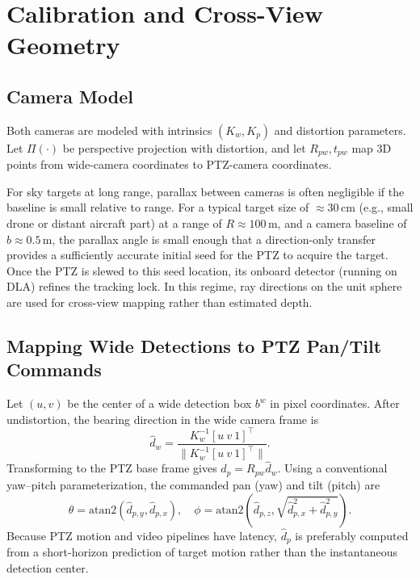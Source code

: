 \documentclass[conf]{new-aiaa}
\begin{document}
{\color{red}
\section{Calibration and Cross-View Geometry}
\subsection{Camera Model}
Both cameras are modeled with intrinsics $(K_w, K_p)$ and distortion parameters. Let $\Pi(\cdot)$ be perspective projection with distortion, and let $R_{pw}, t_{pw}$ map 3D points from wide-camera coordinates to PTZ-camera coordinates.
\par
For sky targets at long range, parallax between cameras is often negligible if the baseline is small relative to range. For a typical target size of $\approx 30$\,cm (e.g., small drone or distant aircraft part) at a range of $R \approx 100$\,m, and a camera baseline of $b \approx 0.5$\,m, the parallax angle is small enough that a direction-only transfer provides a sufficiently accurate initial seed for the PTZ to acquire the target. Once the PTZ is slewed to this seed location, its onboard detector (running on DLA) refines the tracking lock. In this regime, ray directions on the unit sphere are used for cross-view mapping rather than estimated depth.


\subsection{Mapping Wide Detections to PTZ Pan/Tilt Commands}
Let $(u,v)$ be the center of a wide detection box $b^w$ in pixel coordinates. After undistortion, the bearing direction in the wide camera frame is
\begin{equation}
\hat{d}_w = \frac{K_w^{-1}[u \ v \ 1]^\top}{\|K_w^{-1}[u \ v \ 1]^\top\|}.
\end{equation}
Transforming to the PTZ base frame gives $\hat{d}_p = R_{pw}\hat{d}_w$. Using a conventional yaw--pitch parameterization, the commanded pan (yaw) and tilt (pitch) are
\begin{equation}
\theta = \mathrm{atan2}(\hat{d}_{p,y}, \hat{d}_{p,x}), \quad
\phi = \mathrm{atan2}(\hat{d}_{p,z}, \sqrt{\hat{d}_{p,x}^2+\hat{d}_{p,y}^2}).
\end{equation}
Because PTZ motion and video pipelines have latency, $\hat{d}_p$ is preferably computed from a short-horizon prediction of target motion rather than the instantaneous detection center.

}
\end{document}
